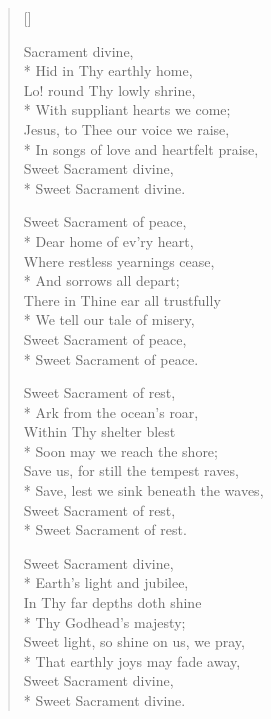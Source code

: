 \newHymn
{}

\begin{verse}[\versewidth]
\begin{patverse}
 Sacrament divine,\\*
Hid in Thy earthly home, \\
Lo! round Thy lowly shrine,\\*                        
With suppliant hearts we come;\\
Jesus, to Thee our voice we raise,\\*
In songs of love and heartfelt praise,\\
Sweet Sacrament divine,\\*           
Sweet Sacrament divine.                            
\end{patverse}

\begin{patverse}
Sweet Sacrament of peace,\\*
Dear home of ev'ry heart,\\
Where restless yearnings cease,\\*
And sorrows all depart;\\
There in Thine ear all trustfully\\*
We tell our tale of misery,\\
Sweet Sacrament of peace,\\*
Sweet Sacrament of peace.
\end{patverse}

\begin{patverse}
Sweet Sacrament of rest,\\*
Ark from the ocean's roar,\\
Within Thy shelter blest\\*
Soon may we reach the shore;\\
Save us, for still the tempest raves,\\*
Save, lest we sink beneath the waves,\\
Sweet Sacrament of rest,\\*
Sweet Sacrament of rest.
\end{patverse}

\begin{patverse}
Sweet Sacrament divine,\\*
Earth's light and jubilee,\\
In Thy far depths doth shine\\*
Thy Godhead's majesty;\\
Sweet light, so shine on us, we pray,\\*
That earthly joys may fade away,\\
Sweet Sacrament divine,\\*
Sweet Sacrament divine.
\end{patverse}

\end{verse}


